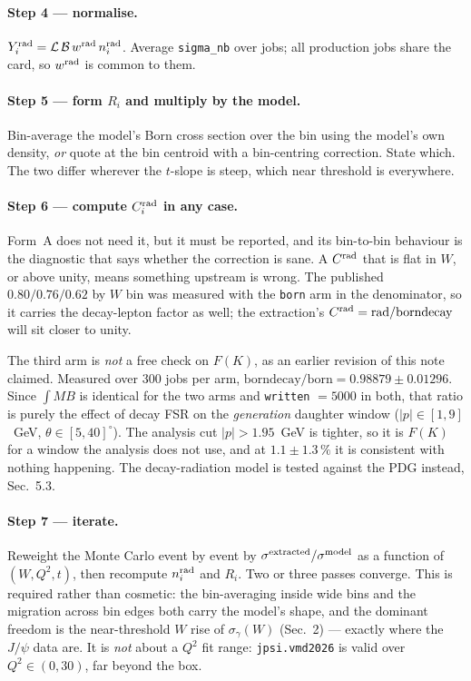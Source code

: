 \documentclass[11pt]{article}
\newcommand{\crad}{C^{\rm rad}}
\newcommand{\Lum}{\mathcal{L}}
\newcommand{\BR}{\mathcal{B}}
\begin{document}
\paragraph{Step 4 --- normalise.}
$Y_i^{\rm rad}=\Lum\,\BR\,w^{\rm rad}\,n_i^{\rm rad}$. Average \texttt{sigma\_nb} over jobs; all
production jobs share the card, so $w^{\rm rad}$ is common to them.

\paragraph{Step 5 --- form $R_i$ and multiply by the model.}
Bin-average the model's Born cross section over the bin using the model's own density, \emph{or}
quote at the bin centroid with a bin-centring correction. State which. The two differ wherever the
$t$-slope is steep, which near threshold is everywhere.

\paragraph{Step 6 --- compute $\crad_i$ in any case.}
Form~A does not need it, but it must be reported, and its bin-to-bin behaviour is the diagnostic
that says whether the correction is sane. A $\crad$ that is flat in $W$, or above unity, means
something upstream is wrong. The published $0.80/0.76/0.62$ by $W$ bin was measured with the
\texttt{born} arm in the denominator, so it carries the decay-lepton factor as well; the
extraction's $\crad=\mathrm{rad}/\mathrm{borndecay}$ will sit closer to unity.

The third arm is \emph{not} a free check on $F(K)$, as an earlier revision of this note claimed.
Measured over 300 jobs per arm, $\mathrm{borndecay}/\mathrm{born}=0.98879\pm0.01296$. Since
$\int MB$ is identical for the two arms and \texttt{written} $=5000$ in both, that ratio is purely
the effect of decay FSR on the \emph{generation} daughter window ($|p|\in[1,9]$~GeV,
$\theta\in[5,40]^\circ$). The analysis cut $|p|>1.95$~GeV is tighter, so it is $F(K)$ for a window
the analysis does not use, and at $1.1\pm1.3\,\%$ it is consistent with nothing happening. The
decay-radiation model is tested against the PDG instead, Sec.~5.3.

\paragraph{Step 7 --- iterate.}
Reweight the Monte Carlo event by event by $\sigma^{\rm extracted}/\sigma^{\rm model}$ as a function
of $(W,Q^2,t)$, then recompute $n_i^{\rm rad}$ and $R_i$. Two or three passes converge. This is
required rather than cosmetic: the bin-averaging inside wide bins and the migration across bin edges
both carry the model's shape, and the dominant freedom is the near-threshold $W$ rise of
$\sigma_\gamma(W)$ (Sec.~2) --- exactly where the $J/\psi$ data are. It is \emph{not} about a $Q^2$
fit range: \texttt{jpsi.vmd2026} is valid over $Q^2\in(0,30)$, far beyond the box.
\end{document}
